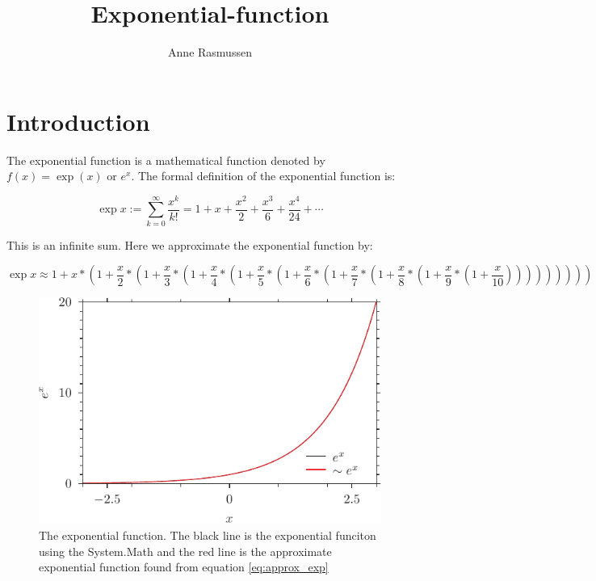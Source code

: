 \documentclass[a4paper]{article}
\begin{document}
\title{Exponential-function}
\author{Anne Rasmussen}
\maketitle


\section{Introduction}

The exponential function is a mathematical function denoted by
$f(x)=\exp(x)$ or $e^x$. The formal definition of the exponential function is: 

\begin{equation}
\exp x := \sum_{k = 0}^{\infty} \frac{x^k}{k!} = 1 + x + \frac{x^2}{2} + \frac{x^3}{6} + \frac{x^4}{24} + \cdots
\end{equation}

This is an infinite sum. Here we approximate the exponential function by: 

\begin{equation} \label{eq:approx_exp}
\exp x \approx 1+x*\left(1+\frac{x}{2}*\left(1+\frac{x}{3}*\left(1+\frac{x}{4}*\left(1+\frac{x}{5}*\left(1+\frac{x}{6}*\left(1+\frac{x}{7}*\left(1+\frac{x}{8}*\left(1+\frac{x}{9}*\left(1+\frac{x}{10}\right)\right)\right)\right)\right)\right)\right)\right)\right)
\end{equation}

\begin{figure}[!h]
\centering
\includegraphics{exp.pdf}
\caption{The exponential function. The black line is the exponential funciton using the System.Math and the red line is the approximate exponential function found from equation \eqref{eq:approx_exp}}
\end{figure}
\end{document}
